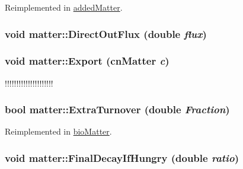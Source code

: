 Reimplemented in \hyperlink{classadded_matter_ac3f88e4d8ae94d0b7f0fe1b06e33d345}{addedMatter}.\hypertarget{classmatter_a8d0cc1e4c20dfb20cbb9eceaa4ad7c67}{
\subsubsection[{DirectOutFlux}]{\setlength{\rightskip}{0pt plus 5cm}void matter::DirectOutFlux (double {\em flux})}}
\label{classmatter_a8d0cc1e4c20dfb20cbb9eceaa4ad7c67}
\hypertarget{classmatter_a3fe12afab8b3df24433e64de80f81e81}{
\subsubsection[{Export}]{\setlength{\rightskip}{0pt plus 5cm}void matter::Export ({\bf cnMatter} {\em c})}}
\label{classmatter_a3fe12afab8b3df24433e64de80f81e81}


!!!!!!!!!!!!!!!!!!!!! \hypertarget{classmatter_a3e3b834e7187ad3447eda29a2703377a}{
\subsubsection[{ExtraTurnover}]{\setlength{\rightskip}{0pt plus 5cm}bool matter::ExtraTurnover (double {\em Fraction})}}
\label{classmatter_a3e3b834e7187ad3447eda29a2703377a}


Reimplemented in \hyperlink{classbio_matter_aaa093e840d976d780d9601562709c044}{bioMatter}.\hypertarget{classmatter_a5f04a9ddefede46fd82848148a5fbab8}{
\subsubsection[{FinalDecayIfHungry}]{\setlength{\rightskip}{0pt plus 5cm}void matter::FinalDecayIfHungry (double {\em ratio})}}
\label{classmatter_a5f04a9ddefede46fd82848148a5fbab8}


